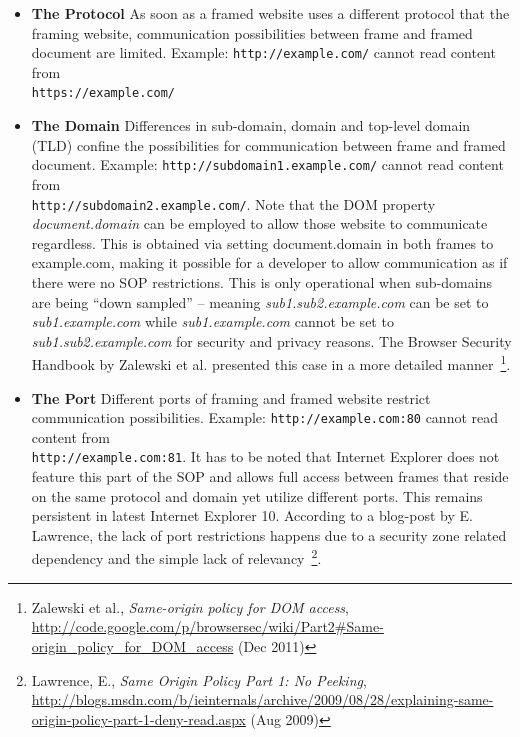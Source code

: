 	\begin{itemize}
	 \item \textbf{The Protocol} As soon as a framed website uses a different protocol that the framing website, communication possibilities between frame and framed document are limited. Example: \texttt{http://example.com/} cannot read content from\\
 \texttt{https://example.com/}
	 \item \textbf{The Domain} Differences in sub-domain, domain and top-level domain (TLD) confine the possibilities for communication between frame and framed document. Example: \texttt{http://subdomain1.example.com/} cannot read content from\\
 \texttt{http://subdomain2.example.com/}. Note that the DOM property \textit{document.domain} can be employed to allow those website to communicate regardless. This is obtained via setting document.domain in both frames to example.com, making it possible for a developer to  allow communication as if there were no SOP restrictions. This is only operational when sub-domains are being ``down sampled'' -- meaning \textit{sub1.sub2.example.com} can be set to \textit{sub1.example.com} while \textit{sub1.example.com} cannot be set to \textit{sub1.sub2.example.com} for security and privacy reasons. The Browser Security Handbook by Zalewski et al. presented this case in a more detailed manner~\footnote{Zalewski et al., \textit{Same-origin policy for DOM access}, \url{http://code.google.com/p/browsersec/wiki/Part2#Same-origin_policy_for_DOM_access} (Dec 2011)}.
	 \item \textbf{The Port} Different ports of framing and framed website restrict communication possibilities. Example: \texttt{http://example.com:80} cannot read content from\\
 \texttt{http://example.com:81}. It has to be noted that Internet Explorer does not feature this part of the SOP and allows full access between frames that reside on the same protocol and domain yet utilize different ports. This remains persistent in latest Internet Explorer 10. According to a blog-post by E. Lawrence, the lack of port restrictions happens due to a security zone related dependency and the simple lack of relevancy~\footnote{Lawrence, E., \textit{Same Origin Policy Part 1: No Peeking}, \url{http://blogs.msdn.com/b/ieinternals/archive/2009/08/28/explaining-same-origin-policy-part-1-deny-read.aspx} (Aug 2009)}.
	\end{itemize}

